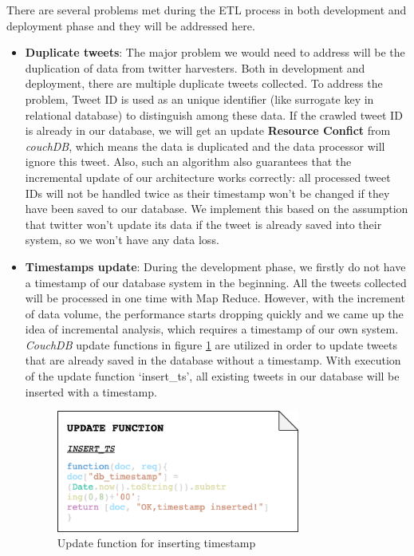 \documentclass{article}
\begin{document}
There are several problems met during the ETL process in both development and deployment phase and they will be addressed here.
\begin{itemize}
    \item \textbf{Duplicate tweets}: The major problem we would need to address will be the duplication of data from twitter harvesters. Both in development and deployment, there are multiple duplicate tweets collected. To address the problem, Tweet ID is used as an unique identifier (like surrogate key in relational database) to distinguish among these data. If the crawled tweet ID is already in our database, we will get an update \textbf{Resource Confict} from \textit{couchDB}, which means the data is duplicated and the data processor will ignore this tweet. Also, such an algorithm also guarantees that the incremental update of our architecture works correctly: all processed tweet IDs will not be handled twice as their timestamp won’t be changed if they have been saved to our database. We implement this based on the assumption that twitter won’t update its data if the tweet is already saved into their system, so we won’t have any data loss.

    \item \textbf{Timestamps update}: During the development phase, we firstly do not have a timestamp of our database system in the beginning. All the tweets collected will be processed in one time with Map Reduce. However, with the increment of data volume, the performance starts dropping quickly and we came up the idea of incremental analysis, which requires a timestamp of our own system. \textit{CouchDB} update functions in figure \ref{fig:insertts} are utilized in order to update tweets that are already saved in the database without a timestamp. With execution of the update function ‘insert\_ts’, all existing tweets in our database will be inserted with a timestamp.
\begin{figure}
\centering
\includegraphics[width=8cm]{img/insert_ts.png}
\caption{Update function for inserting timestamp}
\label{fig:insertts}
\end{figure}
\end{itemize}
\end{document}
